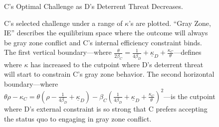 \documentclass[11pt,letterpaper,pdftex,dvipsnames,table]{article}
\begin{document}
\begin{figure}[h]
 \caption{C's Optimal Challenge as D's Deterrent Threat Decreases.}
\caption*{C's selected challenge under a range of $\kappa$'s are plotted. \textquotedblleft Gray Zone, IE\textquotedblright{} describes the equilibrium space where the outcome will always be gray zone conflict and C's internal efficiency constraint binds. The first vertical boundary---where $\frac{\theta}{2\beta_{C}}=\frac{1}{4\beta_{D}}+\underline{\kappa}_{D}+\frac{\kappa_{C}}{\theta}$---defines where $\kappa$ has increased to the cutpoint where D's deterrent threat will start to constrain C's gray zone behavior. The second horizontal boundary---where $\theta\rho-\kappa_{C}=\theta\left(\rho-\frac{1}{4\beta_{D}}+\underline{\kappa}_{D}\right)-\beta_{C}\left(\frac{1}{4\beta_{D}}+\underline{\kappa}_{D}+\frac{\kappa_{C}}{\theta}\right)^{2}$---is the cutpoint where D's external constraint is so strong that C prefers accepting the status quo to engaging in gray zone conflict.}
\label{fig:optimaldetdecrease}
\end{figure}
\end{document}
